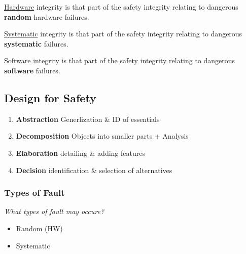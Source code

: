 \documentclass[
  10pt,
  a4paper,
]{article}
\providecommand{\tightlist}{%
  \setlength{\itemsep}{0pt}\setlength{\parskip}{0pt}}\usepackage{longtable,booktabs,array}
\DeclareRobustCommand{\textHighlight}[1]{\tikz[baseline]{\node[anchor=base,fill=Gray!10, rounded corners=5pt, draw, densely dotted] {\bfseries{#1}};}}
\begin{document}
\begin{multicols*}{2}
\ul{Hardware} integrity is that part of the safety integrity relating to
dangerous \textbf{random} hardware failures.

\ul{Systematic} integrity is that part of the safety integrity relating
to dangerous \textbf{systematic} failures.

\ul{Software} integrity is that part of the safety integrity relating to
dangerous \textbf{software} failures.

\subsection{Design for Safety}\label{design-for-safety}

\begin{tcolorbox}[enhanced jigsaw, coltitle=black, toprule=.15mm, colframe=quarto-callout-tip-color-frame, breakable, titlerule=0mm, title=\textcolor{quarto-callout-tip-color}{\faLightbulb}\hspace{0.5em}{General, \ul{Iterative} Design Process}, toptitle=1mm, colback=white, leftrule=.75mm, bottomtitle=1mm, colbacktitle=quarto-callout-tip-color!10!white, left=2mm, bottomrule=.15mm, rightrule=.15mm, arc=.35mm, opacityback=0, opacitybacktitle=0.6]

\begin{enumerate}
\def\labelenumi{\arabic{enumi}.}
\tightlist
\item
  \textbf{Abstraction} Generlization \& ID of essentials
\item
  \textbf{Decomposition} Objects into smaller parts + Analysis
\item
  \textbf{Elaboration} detailing \& adding features
\item
  \textbf{Decision} identification \& selection of alternatives
\end{enumerate}

\end{tcolorbox}

\subsubsection{Types of Fault}\label{types-of-fault}

\vspace{-2mm}{\color{Orchid}\faQuestionCircle[regular]} \emph{What types
of fault may occure?}

\textHighlight{\bfseries N{\fontsize{7pt}{8pt}\selectfont{ATURE}}}

\begin{itemize}
\tightlist
\item
  Random (HW)
\item
  Systematic


\end{itemize}
\end{multicols*}
\end{document}
